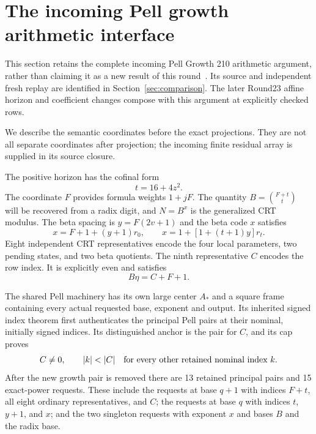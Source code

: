 \section{The incoming Pell growth arithmetic interface}\label{sec:incoming210}\label{g210:sec:interface}

This section retains the complete incoming Pell Growth 210 arithmetic
argument, rather than claiming it as a new result of this round~\cite{growth210}. Its source
and independent fresh replay are identified in Section~\ref{sec:comparison}.
The later Round23 affine horizon and coefficient changes compose with this
argument at explicitly checked rows.

We describe the semantic coordinates before the exact projections. They are
not all separate coordinates after projection; the incoming finite residual array is supplied in its source closure.

The positive horizon has the cofinal form
\begin{equation}\label{g210:eq:horizon}
t=16+4z^2.
\end{equation}
The coordinate $F$ provides formula weights $1+jF$. The quantity
$B=\binom{F+t}{t}$ will be recovered from a radix digit, and $N=B^x$ is the
generalized CRT modulus. The beta spacing is $y=F(2v+1)$ and the beta code
$x$ satisfies
\begin{equation}\label{g210:eq:betaend}
x=F+1+(y+1)r_0,
\qquad x=1+[1+(t+1)y]r_t.
\end{equation}
Eight independent CRT representatives encode the four local parameters, two
pending states, and two beta quotients. The ninth representative $C$ encodes
the row index. It is explicitly even and satisfies
\begin{equation}\label{g210:eq:selector}
B\eta=C+F+1.
\end{equation}

The shared Pell machinery has its own large center $A_*$ and a square frame
containing every actual requested base, exponent and output. Its inherited
signed index theorem first authenticates the principal Pell pairs at their
nominal, initially signed indices. Its distinguished anchor is the pair for
$C$, and its cap proves
\begin{equation}\label{g210:eq:cap}
C\ne0,\qquad |k|<|C|\quad\hbox{for every other retained nominal index }k.
\end{equation}
After the new growth pair is removed there are 13 retained principal pairs
and 15 exact-power requests. These include the requests at base $q+1$ with
indices $F+t$, all eight ordinary representatives, and $C$; the requests at
base $q$ with indices $t$, $y+1$, and $x$; and the two singleton requests
with exponent $x$ and bases $B$ and the radix base.

